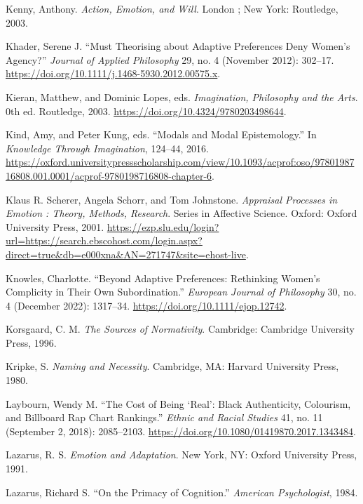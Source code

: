 \documentclass[
  12pt,
]{book}
\newlength{\cslhangindent}
\newenvironment{CSLReferences}[2] %
 {\begin{list}{}{%
  \setlength{\itemindent}{0pt}
  \setlength{\leftmargin}{0pt}
  \setlength{\parsep}{0pt}
  \ifodd #1
   \setlength{\leftmargin}{\cslhangindent}
   \setlength{\itemindent}{-1\cslhangindent}
  \fi
  \setlength{\itemsep}{#2\baselineskip}}}
 {\end{list}}
\theoremstyle{definition}
\theoremstyle{definition}
\theoremstyle{definition}
\theoremstyle{definition}
\theoremstyle{remark}
\begin{document}
\begin{CSLReferences}{1}{0}
Kenny, Anthony. \emph{Action, Emotion, and Will}. London ; New York: Routledge, 2003.

Khader, Serene J. {``Must {Theorising} about {Adaptive Preferences Deny Women}'s {Agency}?''} \emph{Journal of Applied Philosophy} 29, no. 4 (November 2012): 302--17. \url{https://doi.org/10.1111/j.1468-5930.2012.00575.x}.

Kieran, Matthew, and Dominic Lopes, eds. \emph{Imagination, {Philosophy} and the {Arts}}. 0th ed. Routledge, 2003. \url{https://doi.org/10.4324/9780203498644}.

Kind, Amy, and Peter Kung, eds. {``Modals and {Modal Epistemology}.''} In \emph{Knowledge {Through Imagination}}, 124--44, 2016. \url{https://oxford.universitypressscholarship.com/view/10.1093/acprof:oso/9780198716808.001.0001/acprof-9780198716808-chapter-6}.

Klaus R. Scherer, Angela Schorr, and Tom Johnstone. \emph{Appraisal {Processes} in {Emotion} : {Theory}, {Methods}, {Research}}. Series in {Affective Science}. Oxford: Oxford University Press, 2001. \url{https://ezp.slu.edu/login?url=https://search.ebscohost.com/login.aspx?direct=true&db=e000xna&AN=271747&site=ehost-live}.

Knowles, Charlotte. {``Beyond Adaptive Preferences: {Rethinking} Women's Complicity in Their Own Subordination.''} \emph{European Journal of Philosophy} 30, no. 4 (December 2022): 1317--34. \url{https://doi.org/10.1111/ejop.12742}.

Korsgaard, C. M. \emph{The Sources of Normativity}. Cambridge: Cambridge University Press, 1996.

Kripke, S. \emph{Naming and Necessity}. Cambridge, MA: Harvard University Press, 1980.

Laybourn, Wendy M. {``The Cost of Being {`Real'}: Black Authenticity, Colourism, and {Billboard Rap Chart} Rankings.''} \emph{Ethnic and Racial Studies} 41, no. 11 (September 2, 2018): 2085--2103. \url{https://doi.org/10.1080/01419870.2017.1343484}.

Lazarus, R. S. \emph{Emotion and Adaptation}. New York, NY: Oxford University Press, 1991.

Lazarus, Richard S. {``On the {Primacy} of {Cognition}.''} \emph{American Psychologist}, 1984.


\end{CSLReferences}
\end{document}
